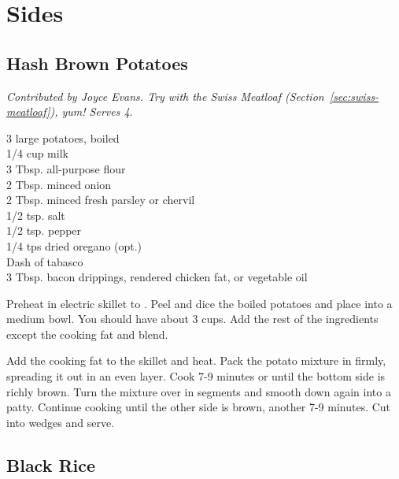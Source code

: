 \chapter{Sides}

\section{Hash Brown Potatoes}

\textit{Contributed by Joyce Evans. Try with the Swiss Meatloaf 
(Section~\ref{sec:swiss-meatloaf}), yum! Serves 4}.
\begin{ingredients}
3 large potatoes, boiled \\
1/4 cup milk \\
3 Tbsp. all-purpose flour \\
2 Tbsp. minced onion \\
2 Tbsp. minced fresh parsley or chervil \\
1/2 tsp. salt \\
1/2 tsp. pepper \\
1/4 tps dried oregano (opt.) \\
Dash of tabasco \\
3 Tbsp. bacon drippings, rendered chicken fat, or vegetable oil
\end{ingredients}
Preheat in electric skillet to . Peel and dice the boiled potatoes
and place into a medium bowl. You should have about 3 cups. Add the rest of the
ingredients except the cooking fat and blend. 

Add the cooking fat to the skillet and heat. Pack the potato mixture in firmly,
spreading it out in an even layer. Cook 7-9 minutes or until the bottom side is
richly brown. Turn the mixture over in segments and smooth down again into a
patty. Continue cooking until the other side is brown, another 7-9 minutes.
Cut into wedges and serve.

\section{Black Rice}

